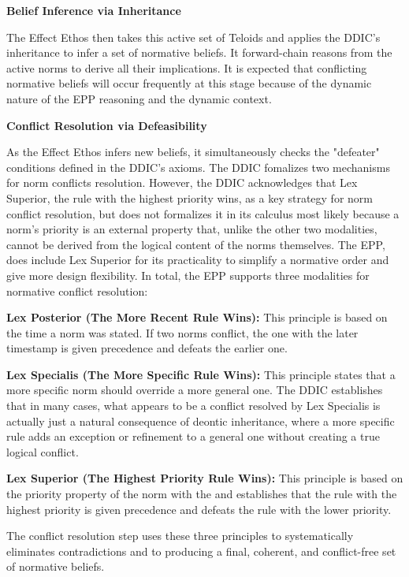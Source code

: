 \textbf{Belief Inference via Inheritance}

The Effect Ethos then takes this active set of Teloids and applies the DDIC's inheritance to infer a set of normative beliefs. It forward-chain reasons from the active norms to derive all their implications. It is expected that conflicting normative beliefs will occur frequently at this stage because of the dynamic nature of the EPP reasoning and the dynamic context.  

\textbf{Conflict Resolution via Defeasibility}

As the Effect Ethos infers new beliefs, it simultaneously checks the "defeater" conditions defined in the DDIC's axioms. The DDIC fomalizes two mechanisms for norm conflicts resolution.  However, the DDIC  acknowledges that Lex Superior, the rule with the highest priority wins, as a key strategy for norm conflict resolution, but does not formalizes it in its calculus most likely because a norm's priority is an external property that, unlike the other two modalities, cannot be derived from the logical content of the norms themselves. The EPP, does include Lex Superior for its practicality to simplify a normative order and give more design flexibility. In total, the EPP supports three modalities for normative conflict resolution:  

\textbf{Lex Posterior (The More Recent Rule Wins):}  This principle is based on the time a norm was stated. If two norms conflict, the one with the later timestamp is given precedence and defeats the earlier one\cite{olson2024DDIC}.

\textbf{Lex Specialis (The More Specific Rule Wins):} This principle states that a more specific norm should override a more general one. The  DDIC establishes that in many cases, what appears to be a conflict resolved by Lex Specialis is actually just a natural consequence of deontic inheritance, where a more specific rule adds an exception or refinement to a general one without creating a true logical conflict\cite{olson2024DDIC}.  

\textbf{Lex Superior (The Highest Priority Rule Wins): } This principle is based on the priority property of the norm with the and establishes that the rule with the highest priority is given precedence and defeats the rule with the lower priority.  

The conflict resolution step uses these three principles to systematically eliminates contradictions and to producing a final, coherent, and conflict-free set of normative beliefs.

